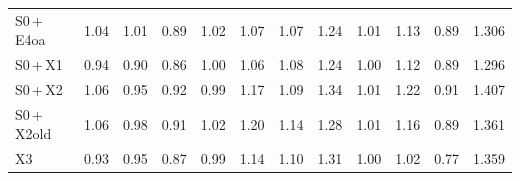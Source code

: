 \begin{tabular}{@{}l r r r r r r r r r r r@{}}
S0\,+\,E4oa & 1.04 & 1.01 & 0.89 & 1.02 & 1.07 & 1.07 & 1.24 & 1.01 & 1.13 & 0.89 & 1.306 \\
S0\,+\,X1 & 0.94 & 0.90 & 0.86 & 1.00 & 1.06 & 1.08 & 1.24 & 1.00 & 1.12 & 0.89 & 1.296 \\
S0\,+\,X2 & 1.06 & 0.95 & 0.92 & 0.99 & 1.17 & 1.09 & 1.34 & 1.01 & 1.22 & 0.91 & 1.407 \\
S0\,+\,X2old & 1.06 & 0.98 & 0.91 & 1.02 & 1.20 & 1.14 & 1.28 & 1.01 & 1.16 & 0.89 & 1.361 \\
X3 & 0.93 & 0.95 & 0.87 & 0.99 & 1.14 & 1.10 & 1.31 & 1.00 & 1.02 & 0.77 & 1.359 \\
\bottomrule
\end{tabular}
